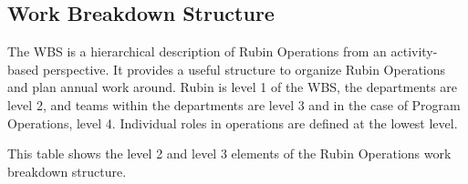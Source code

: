 \subsection{Work Breakdown Structure}
\label{sec:wbs}

The \gls{WBS} is a hierarchical description of Rubin Operations from an activity-based perspective.
It provides a useful structure to organize Rubin Operations and plan annual work around.
Rubin is level 1 of the WBS, the departments are level 2, and teams within the departments are level 3 and in the case of Program Operations, level 4.
Individual roles in operations are defined at the lowest level.

This table shows the level 2 and level 3 elements of the Rubin Operations work breakdown structure.



